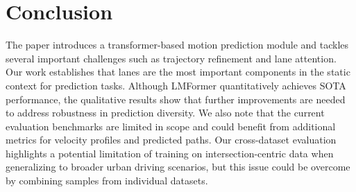 \section{Conclusion}
The paper introduces a transformer-based motion prediction module and tackles several important challenges such as trajectory refinement and lane attention. Our work establishes that lanes are the most important components in the static context for prediction tasks. Although LMFormer quantitatively achieves SOTA performance, the qualitative results show that further improvements are needed to address robustness in prediction diversity. We also note that the current evaluation benchmarks are limited in scope and could benefit from additional metrics for velocity profiles and predicted paths. Our cross-dataset evaluation highlights a potential limitation of training on intersection-centric data when generalizing to broader urban driving scenarios, but this issue could be overcome by combining samples from individual datasets.